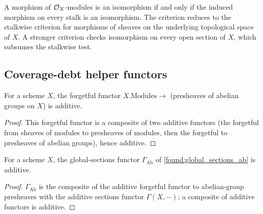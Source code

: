 \begin{lemma}
  \leanok
  \label{def:peer_module_iso_locality}
  A morphism of \(\mathcal{O}_X\)-modules is an isomorphism if and only if the induced
  morphism on every stalk is an isomorphism.  The criterion reduces to the
  stalkwise criterion for morphisms of sheaves on the underlying topological
  space of \(X\).  A stronger criterion checks isomorphism on every open section
  of \(X\), which subsumes the stalkwise test.
\end{lemma}

\subsection{Coverage-debt helper functors}

\begin{lemma}
  \label{found:modules_topresheaf_additive}
  For a scheme \(X\), the forgetful functor \(X.\mathrm{Modules}\to\) (presheaves
  of abelian groups on \(X\)) is additive.
\end{lemma}

\begin{proof}
  \leanok
  This forgetful functor is a composite of two additive functors (the forgetful
  from sheaves of modules to presheaves of modules, then the forgetful to
  presheaves of abelian groups), hence additive.
\end{proof}

\begin{lemma}
  \label{found:global_sections_ab_additive}
  For a scheme \(X\), the global-sections functor
  \(\Gamma_{\mathrm{Ab}}\) of \cref{found:global_sections_ab} is additive.
\end{lemma}

\begin{proof}
  \leanok
  \(\Gamma_{\mathrm{Ab}}\) is the composite of the additive forgetful functor to
  abelian-group presheaves with the additive sections functor \(\Gamma(X,-)\); a
  composite of additive functors is additive.
\end{proof}

